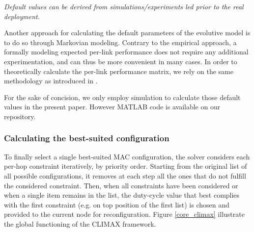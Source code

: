 \documentclass[12pt,journal,compsoc]{IEEEtran}
\begin{document}
\textit{Default values can be derived from simulations/experiments led prior to the real deployment.}

Another approach for calculating the default parameters of the evolutive model is to do so through Markovian modeling. Contrary to the empirical approach, a formally modeling expected per-link performance does not require any additional experimentation, and can thus be more convenient in many cases.
In order to theoretically calculate the per-link performance matrix, we rely on the same methodology as introduced in \cite{yang11}. 

For the sake of concision, we only employ simulation to calculate those default values in the present paper. However MATLAB code is available on our repository.

\subsubsection{Calculating the best-suited configuration}

To finally select a single best-suited MAC configuration, the solver considers each per-hop constraint iteratively, by priority order. Starting from the original list of all possible configurations, it removes at each step all the ones that do not fulfill the considered constraint. Then, when all constraints have been considered or when a single item remains in the list, the duty-cycle value that best complies with the first constraint (e.g. on top position of the first list) is chosen and provided to the current node for reconfiguration. Figure \ref{core_climax} illustrate the global functioning of the CLIMAX framework.%
\end{document}
